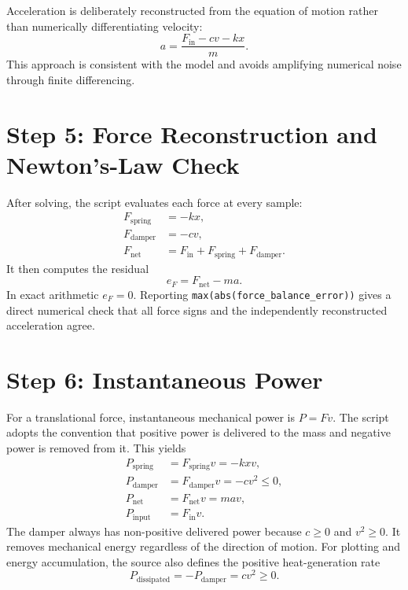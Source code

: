 \documentclass[11pt]{article}
\begin{document}
Acceleration is deliberately reconstructed from the equation of motion rather than numerically differentiating velocity:
\begin{equation}
a=\frac{F_{\mathrm{in}}-cv-kx}{m}.
\end{equation}
This approach is consistent with the model and avoids amplifying numerical noise through finite differencing.

\section{Step 5: Force Reconstruction and Newton's-Law Check}
After solving, the script evaluates each force at every sample:
\begin{align}
F_{\mathrm{spring}}&=-kx,\\
F_{\mathrm{damper}}&=-cv,\\
F_{\mathrm{net}}&=F_{\mathrm{in}}+F_{\mathrm{spring}}+F_{\mathrm{damper}}.
\end{align}
It then computes the residual
\begin{equation}
e_F=F_{\mathrm{net}}-ma.
\end{equation}
In exact arithmetic $e_F=0$. Reporting \texttt{max(abs(force\_balance\_error))} gives a direct numerical check that all force signs and the independently reconstructed acceleration agree.

\section{Step 6: Instantaneous Power}
For a translational force, instantaneous mechanical power is $P=Fv$. The script adopts the convention that positive power is delivered to the mass and negative power is removed from it. This yields
\begin{align}
P_{\mathrm{spring}}&=F_{\mathrm{spring}}v=-kxv,\\
P_{\mathrm{damper}}&=F_{\mathrm{damper}}v=-cv^2\leq0,\\
P_{\mathrm{net}}&=F_{\mathrm{net}}v=mav,\\
P_{\mathrm{input}}&=F_{\mathrm{in}}v.
\end{align}
The damper always has non-positive delivered power because $c\geq0$ and $v^2\geq0$. It removes mechanical energy regardless of the direction of motion. For plotting and energy accumulation, the source also defines the positive heat-generation rate
\begin{equation}
P_{\mathrm{dissipated}}=-P_{\mathrm{damper}}=cv^2\geq0.
\end{equation}
\end{document}
